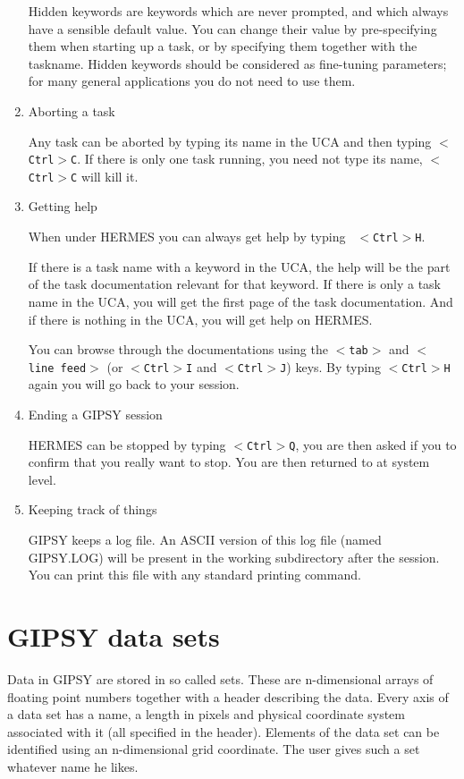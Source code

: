 \begin{enumerate}
Hidden keywords are keywords which are never prompted, and
which always have a sensible default value.  You can change their value
by pre-specifying them when starting up a task, or by specifying them
together with the taskname.  Hidden keywords should
be considered as fine-tuning parameters; for many general applications 
you do not need to use them.


\item Aborting a task

Any task can be aborted by typing its name in the UCA and then typing
{\tt $<$Ctrl$>$C}.  If there is only one task running, you need not type its
name, {\tt $<$Ctrl$>$C} will kill it. 

\item Getting help

    When under HERMES you can always get help by typing {\tt
$<$Ctrl$>$H}. 

If there is a task name with a keyword in the UCA, the help will be the
part of the task documentation relevant for that keyword.  If there is
only a task name in the UCA, you will get the first page of the task
documentation.  And if there is nothing in the UCA, you will get help on
HERMES. 

You can browse through the documentations using the {\tt $<$tab$>$} and
{\tt $<$line~feed$>$} (or {\tt $<$Ctrl$>$I} and {\tt $<$Ctrl$>$J}) 
keys. By typing {\tt $<$Ctrl$>$H} again you will
go back to your session.

\item Ending a GIPSY session

HERMES can be stopped by typing {\tt $<$Ctrl$>$Q}, you are then asked if
you to confirm that you really want to stop.  You are then returned to
at system level.

\item Keeping track of things

GIPSY keeps a log file. An ASCII version of this log file
(named GIPSY.LOG) will be present in the working subdirectory after the
session. You can print this file with any standard printing command.

\end{enumerate}

\section{GIPSY data sets}
\label{sec:GoSets}

Data in GIPSY are stored in so called sets.  These are n-dimensional
arrays of floating point numbers together with a header describing the
data.  Every axis of a data set has a name, a length in pixels and
physical coordinate system associated with it (all specified in the
header).  Elements of the data set can be identified using an
n-dimensional grid coordinate. The user gives such a set whatever name
he likes.

